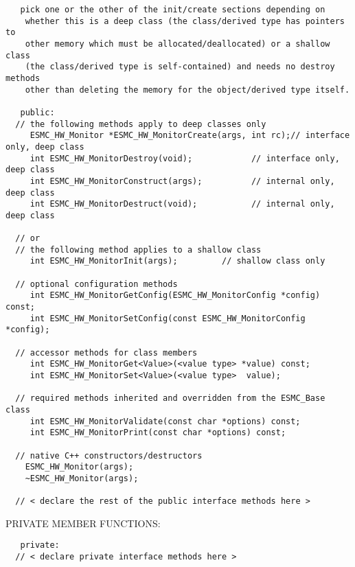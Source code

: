 \begin{verbatim}   pick one or the other of the init/create sections depending on
    whether this is a deep class (the class/derived type has pointers to
    other memory which must be allocated/deallocated) or a shallow class
    (the class/derived type is self-contained) and needs no destroy methods
    other than deleting the memory for the object/derived type itself.
 
   public:
  // the following methods apply to deep classes only
     ESMC_HW_Monitor *ESMC_HW_MonitorCreate(args, int rc);// interface only, deep class
     int ESMC_HW_MonitorDestroy(void);            // interface only, deep class
     int ESMC_HW_MonitorConstruct(args);          // internal only, deep class
     int ESMC_HW_MonitorDestruct(void);           // internal only, deep class
 
  // or
  // the following method applies to a shallow class
     int ESMC_HW_MonitorInit(args);         // shallow class only
 
  // optional configuration methods
     int ESMC_HW_MonitorGetConfig(ESMC_HW_MonitorConfig *config) const;
     int ESMC_HW_MonitorSetConfig(const ESMC_HW_MonitorConfig *config);
 
  // accessor methods for class members
     int ESMC_HW_MonitorGet<Value>(<value type> *value) const;
     int ESMC_HW_MonitorSet<Value>(<value type>  value);
     
  // required methods inherited and overridden from the ESMC_Base class
     int ESMC_HW_MonitorValidate(const char *options) const;
     int ESMC_HW_MonitorPrint(const char *options) const;
 
  // native C++ constructors/destructors
 	ESMC_HW_Monitor(args);
 	~ESMC_HW_Monitor(args);
   
  // < declare the rest of the public interface methods here >
   \end{verbatim}{\sf PRIVATE MEMBER FUNCTIONS:}
\begin{verbatim}   private: 
  // < declare private interface methods here >\end{verbatim}

